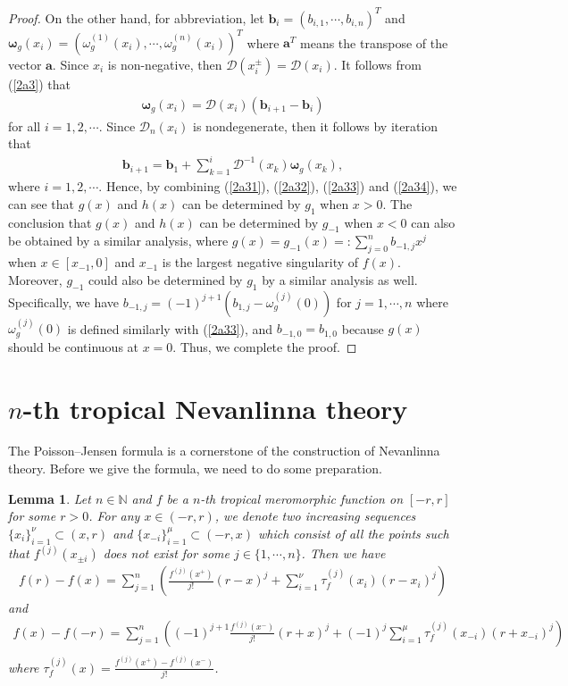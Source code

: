 \documentclass{article}
\newtheorem{lemma}[defin]{Lemma}
\begin{document}
\begin{proof}
     On the other hand, for abbreviation, let $\textbf{b}_{i}=(b_{i, 1}, \cdots, b_{i, n})^{T}$ and $\pmb{\omega}_{g}(x_{i})=(\omega_{g}^{(1)}(x_{i}), \cdots, \omega_{g}^{(n)}(x_{i}))^{T}$ where $\textbf{a}^{T}$ means the transpose of the vector $\textbf{a}$. Since $x_{i}$ is non-negative, then $\mathcal{D}(x_{i}^{\pm})=\mathcal{D}(x_{i})$. It follows from (\ref{2a3}) that
     \begin{eqnarray*}
         \pmb{\omega}_{g}(x_{i})=\mathcal{D}(x_{i})(\textbf{b}_{i+1}-\textbf{b}_{i})
     \end{eqnarray*}
     for all $i=1, 2, \cdots$. Since $\mathcal{D}_{n}(x_{i})$ is nondegenerate, then it follows by iteration that
     \begin{eqnarray}\label{2a34}
         \textbf{b}_{i+1}=\textbf{b}_{1}+\sum_{k=1}^{i}\mathcal{D}^{-1}(x_{k})\pmb{\omega}_{g}(x_{k}),
     \end{eqnarray}
     where $i=1, 2, \cdots$. Hence, by combining (\ref{2a31}), (\ref{2a32}), (\ref{2a33}) and (\ref{2a34}), we can see that $g(x)$ and $h(x)$ can be determined by $g_{1}$ when $x>0$. The conclusion that $g(x)$ and $h(x)$ can be determined by $g_{-1}$ when $x< 0$ can also be obtained by a similar analysis, where $g(x)=g_{-1}(x)=:\sum_{j=0}^{n}b_{-1, j}x^{j}$ when $x\in[x_{-1}, 0]$ and $x_{-1}$ is the largest negative singularity of $f(x)$. Moreover, $g_{-1}$ could also be determined by $g_{1}$ by a similar analysis as well. Specifically, we have $b_{-1, j}=(-1)^{j+1}(b_{1, j}-\omega_{g}^{(j)}(0))$ for $j=1, \cdots, n$ where $\omega_{g}^{(j)}(0)$ is defined similarly with (\ref{2a33}), and $b_{-1, 0}=b_{1, 0}$ because $g(x)$ should be continuous at $x=0$. Thus, we complete the proof.
\end{proof}

\section{$n$-th tropical Nevanlinna theory}
 The Poisson–Jensen formula is a cornerstone of the construction of Nevanlinna theory. Before we give the formula, we need to do some preparation.
 \begin{lemma}\label{lemma3.1}
     Let $n\in\mathbb{N}$ and $f$ be a $n$-th tropical meromorphic function on $[-r, r]$ for some $r>0$. For any $x\in (-r, r)$, we denote two increasing sequences $\{x_{i}\}_{i=1}^{\nu}\subset (x, r)$ and $\{x_{-i}\}_{i=1}^{\mu}\subset (-r, x)$ which consist of all the points such that $f^{(j)}(x_{\pm i})$ does not exist for some $j\in\{1, \cdots, n\}$. Then we have
     \begin{eqnarray}\label{3p1}
    f(r)-f(x)=\sum_{j=1}^{n}\left(\frac{f^{(j)}(x^{+})}{j!}(r-x)^{j}+\sum_{i=1}^{\nu}\tau_{f}^{(j)}(x_{i})(r-x_{i})^{j}\right)
\end{eqnarray}
and
\begin{eqnarray}\label{3p2}
    f(x)-f(-r)=\sum_{j=1}^{n}\left((-1)^{j+1}\frac{f^{(j)}(x^{-})}{j!}(r+x)^{j}+(-1)^{j}\sum_{i=1}^{\mu}\tau_{f}^{(j)}(x_{-i})(r+x_{-i})^{j}\right)\nonumber\\
\end{eqnarray}
where $\tau_{f}^{(j)}(x)=\frac{f^{(j)}(x^{+})-f^{(j)}(x^{-})}{j!}$. 
 \end{lemma}
\end{document}
